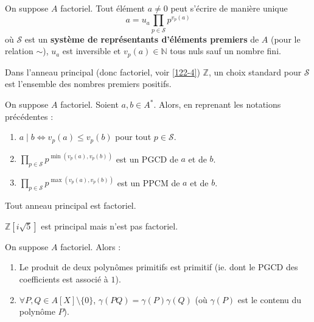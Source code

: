 
  \begin{proposition}
    On suppose $A$ factoriel. Tout élément $a \neq 0$ peut s'écrire de manière unique
    \[ a = u_a \prod_{p \in \mathcal{S}} p^{v_p(a)} \]
    où $\mathcal{S}$ est un \textbf{système de représentants d'éléments premiers} de $A$ (pour le relation $\sim$), $u_a$ est inversible et $v_p(a) \in \mathbb{N}$ tous nuls sauf un nombre fini.
  \end{proposition}

  \begin{example}
    Dans l'anneau principal (donc factoriel, voir \cref{122-4}) $\mathbb{Z}$, un choix standard pour $\mathcal{S}$ est l'ensemble des nombres premiers positifs.
  \end{example}

  \begin{proposition}
    On suppose $A$ factoriel. Soient $a, b \in A^*$. Alors, en reprenant les notations précédentes :
    \begin{enumerate}[label=(\roman*)]
      \item $a \mid b \iff v_p(a) \leq v_p(b)$ pour tout $p \in \mathcal{S}$.
      \item $\prod_{p \in \mathcal{S}} p^{\min(v_p(a), v_p(b))}$ est un PGCD de $a$ et de $b$.
      \item $\prod_{p \in \mathcal{S}} p^{\max(v_p(a), v_p(b))}$ est un PPCM de $a$ et de $b$.
    \end{enumerate}
  \end{proposition}

  \begin{theorem}
    \label{122-4}
    Tout anneau principal est factoriel.
  \end{theorem}

  \begin{cexample}
    $\mathbb{Z}[i\sqrt{5}]$ est principal mais n'est pas factoriel.
  \end{cexample}


  \begin{lemma}[Gauss]
    On suppose $A$ factoriel. Alors :
    \begin{enumerate}[label=(\roman*)]
      \item Le produit de deux polynômes primitifs est primitif (ie. dont le PGCD des coefficients est associé à $1$).
      \item $\forall P, Q \in A[X] \setminus \{ 0 \}$, $\gamma(PQ) = \gamma(P) \gamma(Q)$ (où $\gamma(P)$ est le contenu du polynôme $P$).
    \end{enumerate}
  \end{lemma}

